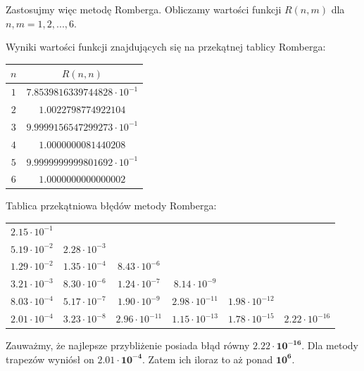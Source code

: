 \documentclass[12p]{article}
\begin{document}
Zastosujmy więc metodę Romberga. Obliczamy wartości funkcji $ R(n,m) $ dla $n,m = 1,2,...,6$.

Wyniki wartości funkcji znajdujących się na przekątnej tablicy Romberga:

\begin{table}[h]
\centering
\begin{tabular}{|c|c|}
    \hline
\large $n$   & $R(n,n)$   
    \normalsize\\
    \hline
    $1$      & $7.8539816339744828\cdot10^{-1}$ \\ \hline
    $2$      &   $1.0022798774922104$ \\ \hline
    $3$      &  $9.9999156547299273\cdot10^{-1}$\\ \hline
    $4$      &  $1.0000000081440208$ \\ \hline
    $5$      &  $9.9999999999801692\cdot 10^{-1}$\\ \hline
    $6$      &  $1.0000000000000002$ \\ \hline


\end{tabular}
\end{table}

Tablica przekątniowa błędów metody Romberga:

\begin{center}
\begin{tabular}{|*{6}{c|}}
								\cline{1-1}
  $2.15\cdot 10^{-1}$                        \\ \cline{1-2}
  $5.19\cdot 10^{-2}$ & $2.28\cdot 10^{-3}$                 \\ \cline{1-3}
  $1.29\cdot 10^{-2}$ & $1.35\cdot 10^{-4}$ & $8.43\cdot 10^{-6}$              \\ \cline{1-4}
  $3.21\cdot 10^{-3}$ & $8.30\cdot 10^{-6}$ & $1.24\cdot 10^{-7}$ & $8.14\cdot 10^{-9}$         \\ \cline{1-5}
  $8.03\cdot 10^{-4}$ & $5.17\cdot 10^{-7}$ & $1.90\cdot 10^{-9}$ & $2.98\cdot 10^{-11}$ & $1.98\cdot 10^{-12}$     \\ \hline
  $2.01\cdot 10^{-4}$ & $3.23\cdot 10^{-8}$ & $2.96\cdot 10^{-11}$ & $1.15\cdot 10^{-13}$ & $1.78\cdot 10^{-15}$ & $2.22\cdot 10^{-16}$ \\ \hline
\end{tabular}
\end{center}

Zauważmy, że najlepsze przybliżenie posiada błąd równy $\mathbf{2.22\cdot 10^{-16}}$. Dla metody trapezów wyniósł on $\mathbf{2.01\cdot 10^{-4}}$. Zatem ich iloraz to aż ponad $\mathbf{10^6}$.
\end{document}
